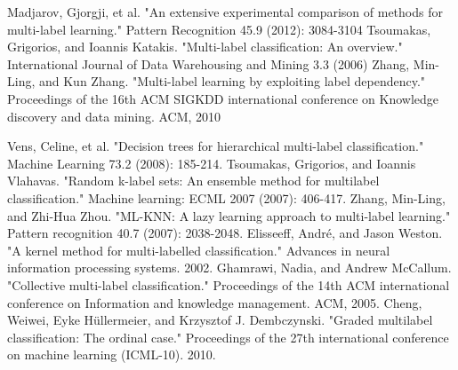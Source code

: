 \documentclass[12pt]{report}
\begin{document}
	\renewcommand\bibname{Related Work and Bibliography}
	\begin{thebibliography}{9}
		Madjarov, Gjorgji, et al. "An extensive experimental comparison of methods for multi-label learning." Pattern Recognition 45.9 (2012): 3084-3104
		 Tsoumakas, Grigorios, and Ioannis Katakis. "Multi-label classification: An overview." International Journal of Data Warehousing and Mining 3.3 (2006)
		 Zhang, Min-Ling, and Kun Zhang. "Multi-label learning by exploiting label dependency." Proceedings of the 16th ACM SIGKDD international conference on Knowledge discovery and data mining. ACM, 2010


 Vens, Celine, et al. "Decision trees for hierarchical multi-label classification." Machine Learning 73.2 (2008): 185-214.
 Tsoumakas, Grigorios, and Ioannis Vlahavas. "Random k-label sets: An ensemble method for multilabel classification." Machine learning: ECML 2007 (2007): 406-417.
 Zhang, Min-Ling, and Zhi-Hua Zhou. "ML-KNN: A lazy learning approach to multi-label learning." Pattern recognition 40.7 (2007): 2038-2048.
 Elisseeff, André, and Jason Weston. "A kernel method for multi-labelled classification." Advances in neural information processing systems. 2002.
  Ghamrawi, Nadia, and Andrew McCallum. "Collective multi-label classification." Proceedings of the 14th ACM international conference on Information and knowledge management. ACM, 2005.
  Cheng, Weiwei, Eyke Hüllermeier, and Krzysztof J. Dembczynski. "Graded multilabel classification: The ordinal case." Proceedings of the 27th international conference on machine learning (ICML-10). 2010.
      
	\end{thebibliography}
\end{document}
